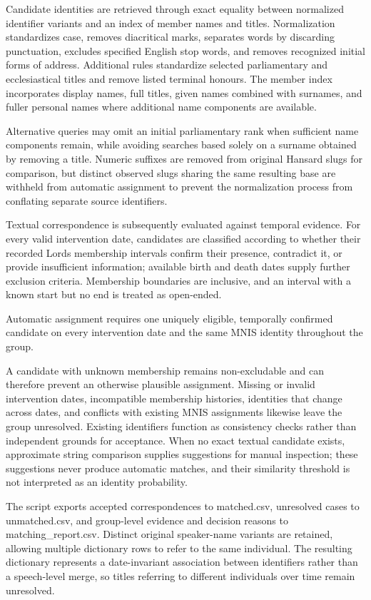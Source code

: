 Candidate identities are retrieved through exact equality between normalized identifier variants and an index of member names and titles. Normalization standardizes case, removes diacritical marks, separates words by discarding punctuation, excludes specified English stop words, and removes recognized initial forms of address. Additional rules standardize selected parliamentary and ecclesiastical titles and remove listed terminal honours. The member index incorporates display names, full titles, given names combined with surnames, and fuller personal names where additional name components are available.

Alternative queries may omit an initial parliamentary rank when sufficient name components remain, while avoiding searches based solely on a surname obtained by removing a title. Numeric suffixes are removed from original Hansard slugs for comparison, but distinct observed slugs sharing the same resulting base are withheld from automatic assignment to prevent the normalization process from conflating separate source identifiers.

Textual correspondence is subsequently evaluated against temporal evidence. For every valid intervention date, candidates are classified according to whether their recorded Lords membership intervals confirm their presence, contradict it, or provide insufficient information; available birth and death dates supply further exclusion criteria. Membership boundaries are inclusive, and an interval with a known start but no end is treated as open-ended.

Automatic assignment requires one uniquely eligible, temporally confirmed candidate on every intervention date and the same MNIS identity throughout the group.

A candidate with unknown membership remains non-excludable and can therefore prevent an otherwise plausible assignment. Missing or invalid intervention dates, incompatible membership histories, identities that change across dates, and conflicts with existing MNIS assignments likewise leave the group unresolved. Existing identifiers function as consistency checks rather than independent grounds for acceptance. When no exact textual candidate exists, approximate string comparison supplies suggestions for manual inspection; these suggestions never produce automatic matches, and their similarity threshold is not interpreted as an identity probability.

The script exports accepted correspondences to matched.csv, unresolved cases to unmatched.csv, and group-level evidence and decision reasons to matching\_report.csv. Distinct original speaker-name variants are retained, allowing multiple dictionary rows to refer to the same individual. The resulting dictionary represents a date-invariant association between identifiers rather than a speech-level merge, so titles referring to different individuals over time remain unresolved.

